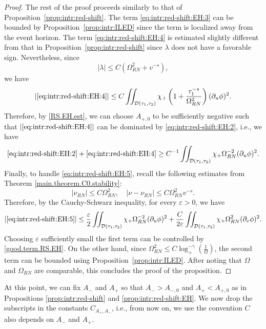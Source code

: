 \documentclass[10pt, reqno]{amsart}
\theoremstyle{definition}
\theoremstyle{remark}
\numberwithin{equation}{section}
\newcommand{\rd}{\partial}
\newcommand{\0}{\emptyset}
\newcommand{\Omg}{\Omega}
\newcommand{\calD}{\mathcal D}
\newcommand{\f}{\frac}
\begin{document}
\begin{proof}
The rest of the proof proceeds similarly to that of Proposition~\ref{prop:intr:red-shift}. The term \eqref{eq:intr:red-shift:EH:3} can be bounded by Proposition~\ref{prop:intr:ILED} since the term is localized away from the event horizon. The term \eqref{eq:intr:red-shift:EH:4} is estimated slightly different from that in Proposition~\ref{prop:intr:red-shift} since $\lambda$ does not have a favorable sign. Nevertheless, since
$$|\lambda|\leq C(\Omg_{RN}^2+v^{-s}),$$
we have
$$|\eqref{eq:intr:red-shift:EH:4}|\leq C\iint_{\calD(\tau_{1}, \tau_{2})} \chi_{+} \left( 1+\f{\tau_1^{-s}}{\Omg^2_{RN}} \right)(\rd_u\phi)^2 .$$
Therefore, by \eqref{RS.EH.est}, we can choose $A_{+,0}$ to be sufficiently negative such that $|\eqref{eq:intr:red-shift:EH:4}|$ can be dominated by \eqref{eq:intr:red-shift:EH:2}, i.e., we have
\begin{equation}\label{good.term.RS.EH}
\eqref{eq:intr:red-shift:EH:2}+\eqref{eq:intr:red-shift:EH:4}\geq C^{-1}\iint_{\calD(\tau_{1}, \tau_{2})} \chi_{+} \Omg_{RN}^{-2} (\rd_{u} \phi)^{2}.
\end{equation}
Finally, to handle \eqref{eq:intr:red-shift:EH:5}, recall the following estimates from Theorem \ref{main.theorem.C0.stability}:
$$|\nu_{RN}|\leq C\Omg_{RN}^2,\quad |\nu-\nu_{RN}|\leq C\Omg_{RN}^2 v^{-s}.$$
Therefore, by the Cauchy-Schwarz inequality, for every $\varepsilon>0$, we have
\begin{equation*}
\begin{split}
|\eqref{eq:intr:red-shift:EH:5}| \leq \frac{\varepsilon}{2} \iint_{\calD(\tau_{1}, \tau_{2})} \chi_{+} \Omg_{RN}^{-2} (\rd_{u} \phi)^{2} + \frac{C}{2 \varepsilon} \iint_{\calD(\tau_{1}, \tau_{2})} \chi_{+} \Omg_{RN}^2 (\rd_{v} \phi)^{2} .
\end{split}
\end{equation*}
Choosing $\varepsilon$ sufficiently small the first term can be controlled by \eqref{good.term.RS.EH}. On the other hand, since $\Omg_{RN}^2\leq C\log_+^{-\gamma}(\f{1}{\Omg})$, the second term can be bounded using Proposition~\ref{prop:intr:ILED}. After noting that $\Omg$ and $\Omg_{RN}$ are comparable, this concludes the proof of the proposition. \qedhere 
\end{proof}

At this point, we can fix $A_-$ and $A_+$ so that $A_->A_{-,0}$ and $A_+<A_{+,0}$ as in Propositions \ref{prop:intr:red-shift} and \ref{prop:intr:red-shift:EH}. We now drop the subscripts in the constants $C_{A_+,A_-}$, i.e., from now on, we use the convention $C$ also depends on $A_-$ and $A_+$. 
\end{document}
